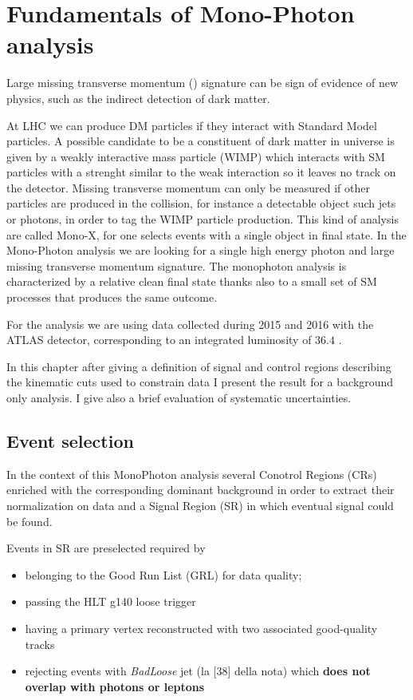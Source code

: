 \chapter{Fundamentals of Mono-Photon analysis}
Large missing transverse momentum (\met) signature can be sign of evidence of new physics, such as the indirect detection of dark matter.

At LHC we can produce DM particles if they interact with Standard Model particles. A possible candidate to be a constituent of dark matter in universe is given by a weakly interactive mass particle (WIMP) which interacts with SM particles with a strenght similar to the weak interaction so it leaves no track on the detector. Missing transverse momentum can only be measured  if other particles are produced in the collision, for instance a detectable object such jets or photons, in order to tag the WIMP particle production. This kind of analysis are called Mono-X, for one selects events with a single object in final state. In the Mono-Photon analysis we are looking for a single high energy photon and large missing transverse momentum signature. The monophoton analysis is characterized by a relative clean final state thanks also to a small set of SM processes that produces the same outcome.

For the analysis we are using data collected during 2015 and 2016 with the ATLAS detector, corresponding to an integrated luminosity of $36.4$ \ifb.

In this chapter after giving a definition of signal and control regions describing the kinematic cuts used to constrain data I present the result for a background only analysis. I give also a brief evaluation of systematic uncertainties.

\section{Event selection}
In the context of this MonoPhoton analysis several Conotrol Regions (CRs) enriched with the corresponding dominant background in order to extract their normalization on data and a Signal Region (SR) in which eventual signal could be found.

Events in SR are preselected required by
\begin{itemize}
\item belonging to the Good Run List (GRL) for data quality;
\item passing the { HLT g140 loose} trigger
\item having a primary vertex reconstructed with two associated good-quality tracks
\item rejecting events with {\itshape BadLoose} jet (la [38] della nota) which {\bfseries does not overlap with photons or leptons}
\end{itemize}

